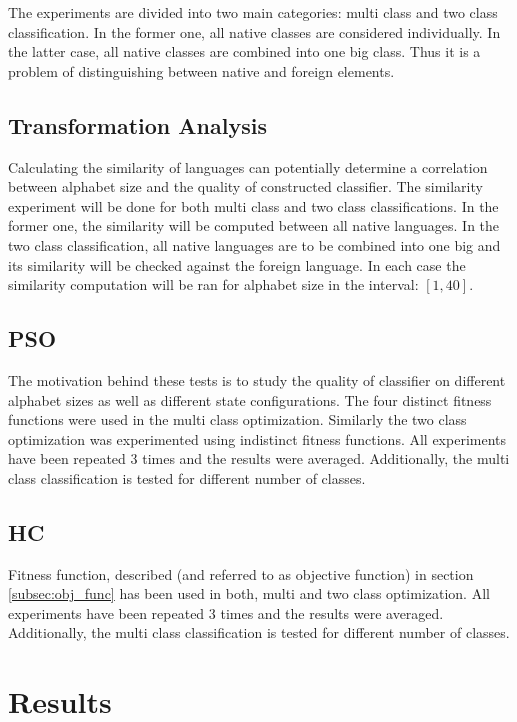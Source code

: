 \documentclass{mini}
\begin{document}
The experiments are divided into two main categories: multi class and two class classification. In the former one, all native classes are considered individually. In the latter case, all native classes are combined into one big class. Thus it is a problem of distinguishing between native and foreign elements.

\section{Transformation Analysis}

Calculating the similarity of languages can potentially determine a correlation between alphabet size and the quality of constructed classifier. The similarity experiment will be done for both multi class and two class classifications. In the former one, the similarity will be computed between all native languages. In the two class classification, all native languages are to be combined into one big and its similarity will be checked against the foreign language. In each case the similarity computation will be ran for alphabet size in the interval: $[1,40]$.


\section{PSO}
The motivation behind these tests is to study the quality of classifier on different alphabet sizes as well as different state configurations. The four distinct fitness functions were used in the multi class optimization. Similarly the two class optimization was experimented using indistinct fitness functions. All experiments have been repeated $3$ times and the results were averaged. Additionally, the multi class classification is tested for different number of classes. 
\section{HC}
Fitness function, described (and referred to as objective function) in section \ref{subsec:obj_func} has been used in both, multi and two class optimization. All experiments have been repeated $3$ times and the results were averaged. Additionally, the multi class classification is tested for different number of classes.

\chapter{Results}\label{chap:results}
\end{document}
